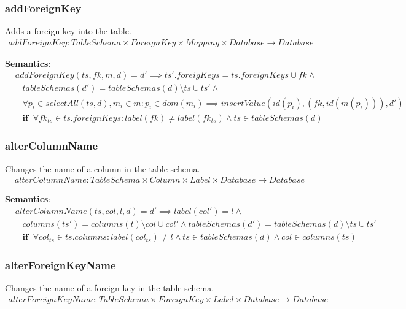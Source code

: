 \documentclass[10pt]{article}
\begin{document}
\subsubsection{addForeignKey}
Adds a foreign key into the table.
\begin{align}
addForeignKey: TableSchema \times ForeignKey \times Mapping \times Database \rightarrow Database
\end{align}

\noindent \textbf{Semantics}:
\begin{align}
& addForeignKey(ts, fk, m, d) = d' \implies ts'.foreigKeys = ts.foreignKeys \cup fk \land \nonumber \\
& \;\;\; tableSchemas(d') = tableSchemas(d) \setminus ts \cup ts' \land \nonumber \\
& \;\;\; \forall p_i \in selectAll(ts, d), m_i \in m : p_i \in dom(m_i) \implies insertValue(id(p_i), (fk, id(m(p_i))), d')  \nonumber \\
& \;\;\; \mathbf{if}  \;\;  \forall fk_{ts} \in ts.foreignKeys : label(fk) \neq label(fk_{ts}) \land ts \in tableSchemas(d)
\end{align}

\subsubsection{alterColumnName}
Changes the name of a column in the table schema.
\begin{align}
alterColumnName: TableSchema \times Column \times Label \times Database \rightarrow Database
\end{align}

\noindent \textbf{Semantics}:
\begin{align}
& alterColumnName(ts, col, l, d) = d' \implies label(col') = l \land \nonumber \\
& \;\;\; columns(ts') = columns(t) \setminus col \cup col' \land tableSchemas(d') = tableSchemas(d) \setminus ts \cup ts'  \nonumber \\
& \;\;\; \mathbf{if}  \;\;  \forall col_{ts} \in ts.columns : label(col_{ts}) \neq l \land ts \in tableSchemas(d) \land col \in columns(ts) 
\end{align}

\subsubsection{alterForeignKeyName}
Changes the name of a foreign key in the table schema.
\begin{align}
alterForeignKeyName: TableSchema \times ForeignKey \times Label \times Database \rightarrow Database
\end{align}
\end{document}
